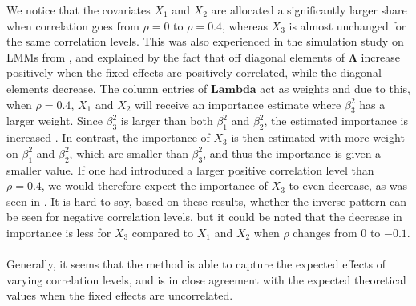 We notice that the covariates $X_1$ and $X_2$ are allocated a significantly larger share when correlation goes from $\rho=0$ to $\rho=0.4$, whereas $X_3$ is almost unchanged for the same correlation levels. This was also experienced in the simulation study on LMMs from \citet{Arnstad}, and explained by the fact that off diagonal elements of $\boldsymbol{\Lambda}$ increase positively when the fixed effects are positively correlated, while the diagonal elements decrease. The column entries of $\mathbf{Lambda}$ act as weights and due to this, when $\rho=0.4$, $X_1$ and $X_2$ will receive an importance estimate where $\beta_3^2$ has a larger weight. Since $\beta_3^2$ is larger than both $\beta_1^2$ and $\beta_2^2$, the estimated importance is increased \citep{Arnstad}. In contrast, the importance of $X_3$ is then estimated with more weight on $\beta_1^2$ and $\beta_2^2$, which are smaller than $\beta_3^2$, and thus the importance is given a smaller value. If one had introduced a larger positive correlation level than $\rho=0.4$, we would therefore expect the importance of $X_3$ to even decrease, as was seen in \citet{Arnstad}. It is hard to say, based on these results, whether the inverse pattern can be seen for negative correlation levels, but it could be noted that the decrease in importance is less for $X_3$ compared to $X_1$ and $X_2$ when $\rho$ changes from $0$ to $-0.1$.
\\
\\
Generally, it seems that the method is able to capture the expected effects of varying correlation levels, and is in close agreement with the expected theoretical values when the fixed effects are uncorrelated.
